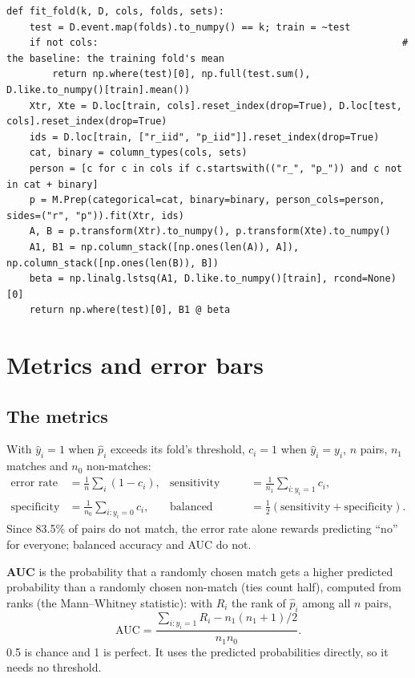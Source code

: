 \documentclass[11pt]{article}
\begin{document}
\begin{lstlisting}[caption={The liking model in one fold (scripts/like\_models.py)}]
def fit_fold(k, D, cols, folds, sets):
    test = D.event.map(folds).to_numpy() == k; train = ~test
    if not cols:                                                     # the baseline: the training fold's mean
        return np.where(test)[0], np.full(test.sum(), D.like.to_numpy()[train].mean())
    Xtr, Xte = D.loc[train, cols].reset_index(drop=True), D.loc[test, cols].reset_index(drop=True)
    ids = D.loc[train, ["r_iid", "p_iid"]].reset_index(drop=True)
    cat, binary = column_types(cols, sets)
    person = [c for c in cols if c.startswith(("r_", "p_")) and c not in cat + binary]
    p = M.Prep(categorical=cat, binary=binary, person_cols=person, sides=("r", "p")).fit(Xtr, ids)
    A, B = p.transform(Xtr).to_numpy(), p.transform(Xte).to_numpy()
    A1, B1 = np.column_stack([np.ones(len(A)), A]), np.column_stack([np.ones(len(B)), B])
    beta = np.linalg.lstsq(A1, D.like.to_numpy()[train], rcond=None)[0]
    return np.where(test)[0], B1 @ beta
\end{lstlisting}

\section{Metrics and error bars}\label{sec:metrics}

\subsection{The metrics}

With $\hat y_i = 1$ when $\hat p_i$ exceeds its fold's threshold, $c_i = 1$ when $\hat y_i = y_i$, $n$ pairs,
$n_1$ matches and $n_0$ non-matches:
\begin{align*}
\text{error rate} &= \tfrac1n \sum_i (1 - c_i), &
\text{sensitivity} &= \tfrac{1}{n_1}\sum_{i: y_i = 1} c_i, \\
\text{specificity} &= \tfrac{1}{n_0}\sum_{i: y_i = 0} c_i, &
\text{balanced accuracy} &= \tfrac12(\text{sensitivity} + \text{specificity}).
\end{align*}
Since 83.5\% of pairs do not match, the error rate alone rewards predicting ``no'' for everyone; balanced accuracy
and AUC do not.

\textbf{AUC} is the probability that a randomly chosen match gets a higher predicted probability than a randomly
chosen non-match (ties count half), computed from ranks (the Mann--Whitney statistic): with $R_i$ the rank of
$\hat p_i$ among all $n$ pairs,
\[
\text{AUC} = \frac{\sum_{i: y_i=1} R_i - n_1(n_1+1)/2}{n_1 n_0}.
\]
0.5 is chance and 1 is perfect. It uses the predicted probabilities directly, so it needs no threshold.
\end{document}

